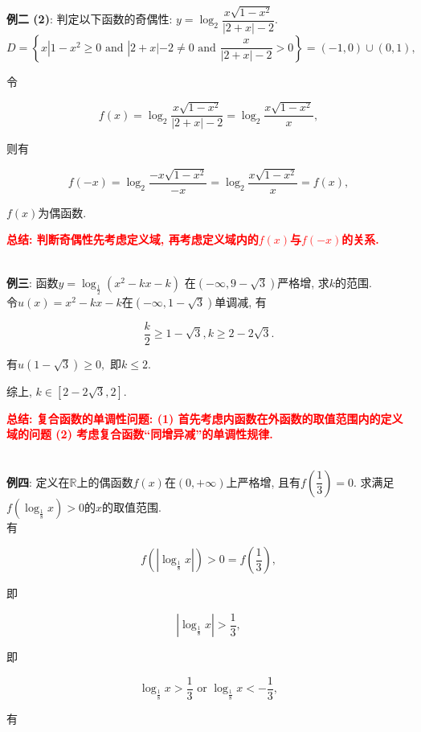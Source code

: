 \documentclass[8pt]{article}
\begin{document}
		\textbf{例二 (2)}: 判定以下函数的奇偶性: $y=\log_{2} \dfrac{x \sqrt{1-x^2}}{|2+x|-2}$.
			~\\

			$D=\left\{x|1-x^2 \geq 0 \text{ and } |2+x|-2 \neq 0 \text{ and } \dfrac{x}{|2+x|-2}>0 \right\}=(-1, 0)\cup(0, 1),$

			令

			$$f(x)=\log_{2} \dfrac{x \sqrt{1-x^2}}{|2+x|-2} =\log_{2} \dfrac{x \sqrt{1-x^2}}{x},$$

			则有

			$$f(-x)=\log_{2} \dfrac{-x \sqrt{1-x^2}}{-x} = \log_{2} \dfrac{x \sqrt{1-x^2}}{x} = f(x),$$

			$f(x)$为偶函数.

			\textbf{\textcolor{red}{总结: 判断奇偶性先考虑定义域, 再考虑定义域内的$f(x)$与$f(-x)$的关系.}}

		~\\

		\textbf{例三}: 函数$y=\log_{\frac{1}{2}} (x^2 - kx - k)$ 在$(-\infty, 9-\sqrt{3})$严格增, 求$k$的范围.
			~\\

			令$u(x) = x^2 - kx - k$在$(-\infty, 1-\sqrt{3})$单调减, 有

			$$\frac{k}{2} \geq 1-\sqrt{3}, k\geq 2-2\sqrt{3}.$$

			有$u(1-\sqrt{3})\geq 0,$ 即$k \leq 2$.

			综上, $k \in [2-2\sqrt{3}, 2].$

			\textbf{\textcolor{red}{总结: 复合函数的单调性问题: (1) 首先考虑内函数在外函数的取值范围内的定义域的问题 (2) 考虑复合函数“同增异减”的单调性规律.}}

		~\\

		\textbf{例四}: 定义在$\mathbb{R}$上的偶函数$f(x)$在$(0, +\infty)$上严格增, 且有$f\left(\dfrac{1}{3}\right)=0$. 求满足$f\left(\log_{\frac{1}{8}} x\right)>0$的$x$的取值范围.
			~\\

			有

			$$f\left(\left\vert \log_{\frac{1}{8}} x \right\vert \right) > 0 = f\left(\frac{1}{3}\right),$$

			即

			$$\left\vert \log_{\frac{1}{8}} x \right\vert > \frac{1}{3},$$

			即

			$$\log_{\frac{1}{8}} x > \frac{1}{3} \text{ or } \log_{\frac{1}{8}} x < -\frac{1}{3},$$

			有
\end{document}
